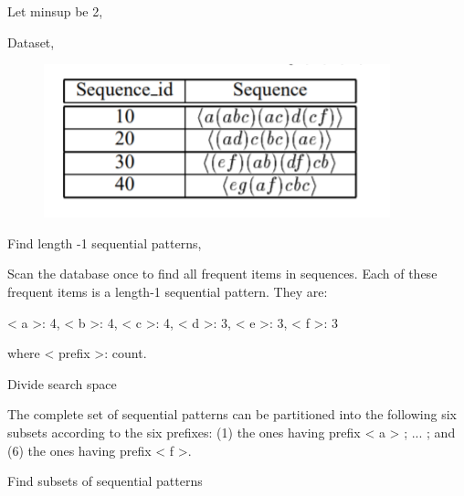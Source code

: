 \documentclass[12pt]{article}
\renewcommand{\_}{\kern-1.5pt\textunderscore\kern-1.5pt}
\begin{document}
Let minsup be 2, \par

Dataset, \par




\begin{figure}[H]
	\begin{Center}
		\includegraphics[width=3.95in,height=1.75in]{./media/image34.png}
	\end{Center}
\end{figure}



\par

Find length -1 sequential patterns, \par

Scan the database once to find all frequent items in sequences. Each of these frequent items is a length-1 sequential pattern. They are: \par

< a >: 4, < b >: 4, < c >: 4, < d >: 3, < e >: 3, < f >: 3\par

where < prefix >: count.\par

Divide search space\par

The complete set of sequential patterns can be partitioned into the following six subsets according to the six prefixes: (1) the ones having prefix < a > ; ... ; and (6) the ones having prefix < f >.\par

Find subsets of sequential patterns\par
\end{document}
